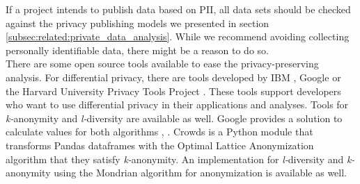     If a project intends to publish data based on PII, all data sets should be checked against the privacy publishing models we presented in section \ref{subsec:related:private_data_analysis}. While we recommend avoiding collecting personally identifiable data, there might be a reason to do so.\\
    There are some open source tools available to ease the privacy-preserving analysis.
    For differential privacy, there are tools developed by IBM \cite{noauthor_ibmdifferential-privacy-library_2021}, Google \cite{noauthor_googledifferential-privacy_2021} or the Harvard University Privacy Tools Project \cite{salil_vadhan_opendp_nodate}. These tools support developers who want to use differential privacy in their applications and analyses.
    Tools for \textit{k-}anonymity and \textit{l-}diversity are available as well. 
    Google provides a solution to calculate values for both algorithms \cite{noauthor_computing_nodate}, \cite{noauthor_computing_nodate-1}. 
    Crowds \cite{mazzone_leo-mazzcrowds_2021} is a Python module that transforms Pandas dataframes with the Optimal Lattice Anonymization algorithm that they satisfy \textit{k-}anonymity. An implementation for \textit{l-}diversity \cite{gong_qiyuangongmondrian_l_diversity_2021} and \textit{k-}anonymity \cite{gong_qiyuangongmondrian_2021} using the Mondrian algorithm for anonymization is available as well.

%
